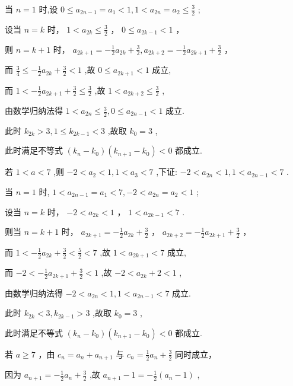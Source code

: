 \documentclass[10pt]{article}
\begin{document}
当 \(n = 1\) 时,设 \(0 \leq  {a}_{{2n} - 1} = {a}_{1} < 1,1 < {a}_{2n} = {a}_{2} \leq  \frac{3}{2}\) ;

设当 \(n = k\) 时， \(1 < {a}_{2k} \leq  \frac{3}{2}\) ， \(0 \leq  {a}_{{2k} - 1} < 1\) ，

则 \(n = k + 1\) 时， \({a}_{{2k} + 1} =  - \frac{1}{2}{a}_{2k} + \frac{3}{2},{a}_{{2k} + 2} =  - \frac{1}{2}{a}_{{2k} + 1} + \frac{3}{2}\) ，

而 \(\frac{3}{4} \leq   - \frac{1}{2}{a}_{2k} + \frac{3}{2} < 1\) ,故 \(0 \leq  {a}_{{2k} + 1} < 1\) 成立,

而 \(1 <  - \frac{1}{2}{a}_{{2k} + 1} + \frac{3}{2} \leq  \frac{3}{2}\) ,故 \(1 < {a}_{{2k} + 2} \leq  \frac{3}{2}\) ,

由数学归纳法得 \(1 < {a}_{2n} \leq  \frac{3}{2},0 \leq  {a}_{{2n} - 1} < 1\) 成立.

此时 \({k}_{2k} > 3,1 \leq  {k}_{{2k} - 1} < 3\) ,故取 \({k}_{0} = 3\) ,

此时满足不等式 \(\left( {{k}_{n} - {k}_{0}}\right) \left( {{k}_{n + 1} - {k}_{0}}\right)  < 0\) 都成立.

若 \(1 < a < 7\) ,则 \(- 2 < {a}_{2} < 1,1 < {a}_{3} < 7\) ,下证: \(- 2 < {a}_{2n} < 1,1 < {a}_{{2n} - 1} < 7\) .

当 \(n = 1\) 时, \(1 < {a}_{{2n} - 1} = {a}_{1} < 7, - 2 < {a}_{2n} = {a}_{2} < 1\) ;

设当 \(n = k\) 时， \(- 2 < {a}_{2k} < 1\) ， \(1 < {a}_{{2k} - 1} < 7\) .

则当 \(n = k + 1\) 时， \({a}_{{2k} + 1} =  - \frac{1}{2}{a}_{2k} + \frac{3}{2}\) ， \({a}_{{2k} + 2} =  - \frac{1}{2}{a}_{{2k} + 1} + \frac{3}{2}\) ，

而 \(1 <  - \frac{1}{2}{a}_{2k} + \frac{3}{2} < \frac{5}{2} < 7\) ,故 \(1 < {a}_{{2k} + 1} < 7\) 成立,

而 \(- 2 <  - \frac{1}{2}{a}_{{2k} + 1} + \frac{3}{2} < 1\) ,故 \(- 2 < {a}_{2k} + 2 < 1\) ,

由数学归纳法得 \(- 2 < {a}_{2n} < 1,1 < {a}_{{2n} - 1} < 7\) 成立.

此时 \({k}_{2k} < 3,{k}_{{2k} - 1} > 3\) ,故取 \({k}_{0} = 3\) ,

此时满足不等式 \(\left( {{k}_{n} - {k}_{0}}\right) \left( {{k}_{n + 1} - {k}_{0}}\right)  < 0\) 都成立.

若 \(a \geq  7\) ，由 \({c}_{n} = {a}_{n} + {a}_{n + 1}\) 与 \({c}_{n} = \frac{1}{2}{a}_{n} + \frac{3}{2}\) 同时成立，

因为 \({a}_{n + 1} =  - \frac{1}{2}{a}_{n} + \frac{3}{2}\) ,故 \({a}_{n + 1} - 1 =  - \frac{1}{2}\left( {{a}_{n} - 1}\right)\) ,
\end{document}
